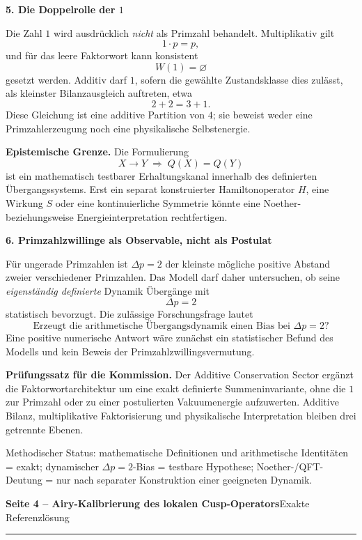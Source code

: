 \documentclass[10pt,a4paper]{article}
\begin{document}
\textbf{5. Die Doppelrolle der $1$}

Die Zahl $1$ wird ausdrücklich \emph{nicht} als Primzahl behandelt. Multiplikativ gilt
\[
1\cdot p=p,
\]
und für das leere Faktorwort kann konsistent
\[
W(1)=\varnothing
\]
gesetzt werden. Additiv darf $1$, sofern die gewählte Zustandsklasse dies zulässt, als kleinster Bilanzausgleich auftreten, etwa
\[
2+2=3+1.
\]
Diese Gleichung ist eine additive Partition von $4$; sie beweist weder eine Primzahlerzeugung noch eine physikalische Selbstenergie.

\begin{statusbox}
\textbf{Epistemische Grenze.} Die Formulierung
\[
X\to Y\;\Longrightarrow\;Q(X)=Q(Y)
\]
ist ein mathematisch testbarer Erhaltungskanal innerhalb des definierten Übergangssystems. Erst ein separat konstruierter Hamiltonoperator $H$, eine Wirkung $S$ oder eine kontinuierliche Symmetrie könnte eine Noether- beziehungsweise Energieinterpretation rechtfertigen.
\end{statusbox}

\textbf{6. Primzahlzwillinge als Observable, nicht als Postulat}

Für ungerade Primzahlen ist $\Delta p=2$ der kleinste mögliche positive Abstand zweier verschiedener Primzahlen. Das Modell darf daher untersuchen, ob seine \emph{eigenständig definierte} Dynamik Übergänge mit
\[
\Delta p=2
\]
statistisch bevorzugt. Die zulässige Forschungsfrage lautet
\[
\boxed{\text{Erzeugt die arithmetische Übergangsdynamik einen Bias bei }\Delta p=2\text{?}}
\]
Eine positive numerische Antwort wäre zunächst ein statistischer Befund des Modells und kein Beweis der Primzahlzwillingsvermutung.

\begin{proofbox}
\textbf{Prüfungssatz für die Kommission.} Der Additive Conservation Sector ergänzt die Faktorwortarchitektur um eine exakt definierte Summeninvariante, ohne die $1$ zur Primzahl oder zu einer postulierten Vakuumenergie aufzuwerten. Additive Bilanz, multiplikative Faktorisierung und physikalische Interpretation bleiben drei getrennte Ebenen.
\end{proofbox}

\vfill
{\footnotesize Methodischer Status: mathematische Definitionen und arithmetische Identitäten = exakt; dynamischer $\Delta p=2$-Bias = testbare Hypothese; Noether-/QFT-Deutung = nur nach separater Konstruktion einer geeigneten Dynamik.}


\newpage

{\Large\bfseries Seite 4 -- Airy-Kalibrierung des lokalen Cusp-Operators}\hfill{\small Exakte Referenzlösung}
\vspace{2mm}
\hrule
\vspace{3mm}
\small
\end{document}
